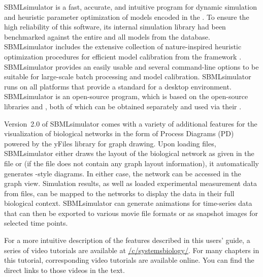 SBMLsimulator is a fast, accurate, and intuitive program for dynamic simulation and heuristic parameter optimization of models encoded in the \SBML.
To ensure the high reliability of this software, its internal simulation library had been
benchmarked against the entire \SBMLTestSuite and all models from the \BioModels database.
SBMLsimulator includes the extensive collection of nature-inspired heuristic optimization procedures for efficient model calibration from the framework \EvA.
SBMLsimulator provides an easily usable \GUI and several command-line options to be suitable for large-scale batch processing and model calibration.
SBMLsimulator runs on all platforms that provide a standard \JVM for a desktop environment.
SBMLsimulator is an open-source program, which is based on the open-source libraries \JSBML and \SBSCL, both of which can be obtained separately and used via their \API.

Version~2.0 of SBMLsimulator comes with a variety of additional features for the visualization of biological networks in the form of \SBGN Process Diagrams (PD) powered by the yFiles library for graph drawing.
Upon loading \SBML files, SBMLsimulator either draws the layout of the biological network as given in the file or (if the \SBML file does not contain any graph layout information), it automatically generates \SBGN-style diagrams.
In either case, the network can be accessed in the graph view.
Simulation results, as well as loaded experimental measurement data from \CSV files, can be mapped to the networks to display the data in their full biological context.
SBMLsimulator can generate animations for time-series data that can then be exported to various movie file formats or as snapshot images for selected time points.

For a more intuitive description of the features described in this users' guide, a series of video tutorials are available at \href{https://youtube.com/c/systemsbiology/}{\faYoutube/c/systemsbiology/}.
For many chapters in this tutorial, corresponding video tutorials are available online.
You can find the direct links to those videos in the text.